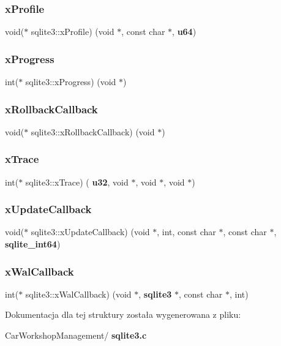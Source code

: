 \subsubsection{xProfile}
{\footnotesize\ttfamily void($\ast$ sqlite3\+::x\+Profile) (void $\ast$, const char $\ast$, \textbf{ u64})}

\mbox{\label{structsqlite3_a8f012471316c9725c2145a3b13dd5caa}} 
\subsubsection{xProgress}
{\footnotesize\ttfamily int($\ast$ sqlite3\+::x\+Progress) (void $\ast$)}

\mbox{\label{structsqlite3_a695c32708202c35cdc35a30ca40e1b6f}} 
\subsubsection{xRollbackCallback}
{\footnotesize\ttfamily void($\ast$ sqlite3\+::x\+Rollback\+Callback) (void $\ast$)}

\mbox{\label{structsqlite3_ad1da15bd3930c142e5cfd09c560d9e3d}} 
\subsubsection{xTrace}
{\footnotesize\ttfamily int($\ast$ sqlite3\+::x\+Trace) (\textbf{ u32}, void $\ast$, void $\ast$, void $\ast$)}

\mbox{\label{structsqlite3_ab562a95a332023d861369ece9591dc3a}} 
\subsubsection{xUpdateCallback}
{\footnotesize\ttfamily void($\ast$ sqlite3\+::x\+Update\+Callback) (void $\ast$, int, const char $\ast$, const char $\ast$, \textbf{ sqlite\+\_\+int64})}

\mbox{\label{structsqlite3_a19a404745ce0b4f13cb29a445281288d}} 
\subsubsection{xWalCallback}
{\footnotesize\ttfamily int($\ast$ sqlite3\+::x\+Wal\+Callback) (void $\ast$, \textbf{ sqlite3} $\ast$, const char $\ast$, int)}



Dokumentacja dla tej struktury została wygenerowana z pliku\+:\begin{DoxyCompactItemize}
\item 
Car\+Workshop\+Management/\textbf{ sqlite3.\+c}\end{DoxyCompactItemize}
